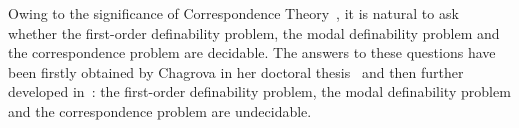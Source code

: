 \documentclass[draft]{article}
\begin{document}
%
%
%
%
%
%
Owing to the significance of Correspondence Theory~\cite{vanBenthem:1983,vanBenthem:1984}, it is natural to ask whether the first-order definability problem, the modal definability problem and the correspondence problem are decidable.
%
%
%
%
The answers to these questions have been firstly obtained by Chagrova in her doctoral thesis~\cite{Chagrova:1989} and then further developed in~\cite{Chagrov:Chagrova:1995,Chagrov:Chagrova:2006,Chagrov:Chagrova:2007,Chagrova:1991}: the first-order definability problem, the modal definability problem and the correspondence problem are undecidable.
%
%
%
%
%
%
\end{document}
